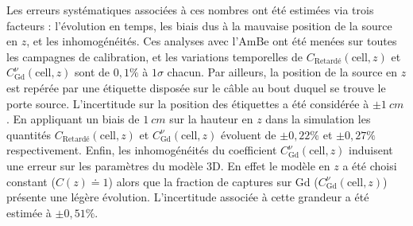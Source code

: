 
Les erreurs systématiques associées à ces nombres ont été estimées via trois facteurs : l'évolution en temps, les biais dus à la mauvaise position de la source en $z$, et les inhomogénéités. Ces analyses avec l'AmBe ont été menées sur toutes les campagnes de calibration, et les variations temporelles de $C_\textrm{Retardé} (\textrm{cell},z)$ et $C^\nu_\textrm{Gd}(\textrm{cell},z)$ sont de $0,1 \%$ à $1\sigma$ chacun. Par ailleurs, la position de la source en $z$ est repérée par une étiquette disposée sur le câble au bout duquel se trouve le porte source. L'incertitude sur la position des étiquettes a été considérée à $\pm \SI{1}{cm}$. En appliquant un biais de $\SI{1}{cm}$ sur la hauteur en $z$ dans la simulation les quantités $C_\textrm{Retardé} (\textrm{cell},z)$ et $C^\nu_\textrm{Gd}(\textrm{cell},z)$ évoluent de $\pm 0,22 \%$ et $\pm 0,27 \%$ respectivement. Enfin, les inhomogénéités du coefficient $C^\nu_\textrm{Gd}(\textrm{cell},z)$ induisent une erreur sur les paramètres du modèle 3D. En effet le modèle en $z$ a été choisi constant ($C(z) \doteq 1$) alors que la fraction de captures sur Gd ($C^\nu_\textrm{Gd}(\textrm{cell},z)$) présente une légère évolution. L'incertitude associée à cette grandeur a été estimée à $\pm 0,51 \%$.\\


